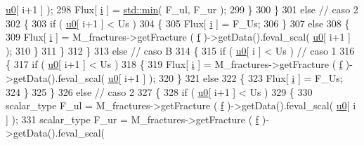 \begin{DoxyCode}
      \hyperlink{god__e_8m_ae060ce5868d35ef17bcb6e832da03be9}{u0}[ i+1 ] );
298                     Flux[ \hyperlink{god__e_8m_a8604be5925f4266ab5ccc69675329c80}{i} ] = \hyperlink{UsefulFunctions_8h_a9700932e89ccb7eeacaee21db125b0c4}{std::min}( F\_ul, F\_ur );
299                 \}
300             \}
301             \textcolor{keywordflow}{else}                    \textcolor{comment}{// caso 2}
302             \{
303                 \textcolor{keywordflow}{if} ( \hyperlink{god__e_8m_ae060ce5868d35ef17bcb6e832da03be9}{u0}[ i+1 ] < Us )
304                 \{
305                     Flux[ \hyperlink{god__e_8m_a8604be5925f4266ab5ccc69675329c80}{i} ] = F\_Us;
306                 \}
307                 \textcolor{keywordflow}{else}
308                 \{
309                     Flux[ \hyperlink{god__e_8m_a8604be5925f4266ab5ccc69675329c80}{i} ] = M\_fractures->getFracture ( \hyperlink{god__e_8m_a68f477f9b30a6300d5af9b02eac82f35}{f} )->getData().feval\_scal( 
      \hyperlink{god__e_8m_ae060ce5868d35ef17bcb6e832da03be9}{u0}[ i+1 ] );
310                 \}
311             \}
312         \}
313         \textcolor{keywordflow}{else}        \textcolor{comment}{// caso B}
314         \{
315             \textcolor{keywordflow}{if} ( \hyperlink{god__e_8m_ae060ce5868d35ef17bcb6e832da03be9}{u0}[ i ] < Us )       \textcolor{comment}{// caso 1}
316             \{
317                 \textcolor{keywordflow}{if} ( \hyperlink{god__e_8m_ae060ce5868d35ef17bcb6e832da03be9}{u0}[ i+1 ] < Us )
318                 \{
319                     Flux[ \hyperlink{god__e_8m_a8604be5925f4266ab5ccc69675329c80}{i} ] = M\_fractures->getFracture ( \hyperlink{god__e_8m_a68f477f9b30a6300d5af9b02eac82f35}{f} )->getData().feval\_scal( 
      \hyperlink{god__e_8m_ae060ce5868d35ef17bcb6e832da03be9}{u0}[ i+1 ] );
320                 \}
321                 \textcolor{keywordflow}{else}
322                 \{
323                     Flux[ \hyperlink{god__e_8m_a8604be5925f4266ab5ccc69675329c80}{i} ] = F\_Us;
324                 \}
325             \}
326             \textcolor{keywordflow}{else}                \textcolor{comment}{// caso 2}
327             \{
328                 \textcolor{keywordflow}{if} ( \hyperlink{god__e_8m_ae060ce5868d35ef17bcb6e832da03be9}{u0}[ i+1 ] < Us )
329                 \{
330                     scalar\_type F\_ul = M\_fractures->getFracture ( \hyperlink{god__e_8m_a68f477f9b30a6300d5af9b02eac82f35}{f} )->getData().feval\_scal( 
      \hyperlink{god__e_8m_ae060ce5868d35ef17bcb6e832da03be9}{u0}[ i ] );
331                     scalar\_type F\_ur = M\_fractures->getFracture ( \hyperlink{god__e_8m_a68f477f9b30a6300d5af9b02eac82f35}{f} )->getData().feval\_scal( 

\end{DoxyCode}
